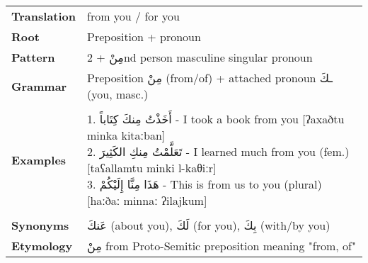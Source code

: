 \documentclass[letterpaper,12pt]{article}
\begin{document}
\begin{tabular}{p{3cm}p{10cm}}
\toprule
\textbf{Translation} & from you / for you \\
\textbf{Root} & Preposition + pronoun \\
\textbf{Pattern} & \textarabic{مِنْ} + 2nd person masculine singular pronoun \\
\textbf{Grammar} & Preposition \textarabic{مِنْ} (from/of) + attached pronoun \textarabic{ـكَ} (you, masc.) \\
\midrule \\
\textbf{Examples} & \makecell[l]{\parbox{9.5cm}{
1. \textarabic{أَخَذْتُ مِنكَ كِتَاباً} - I took a book from you [ʔaxaðtu minka kitaːban]\\
2. \textarabic{تَعَلَّمْتُ مِنكِ الكَثِيرَ} - I learned much from you (fem.) [taʕallamtu minki l-kaθiːr]\\
3. \textarabic{هَذَا مِنَّا إِلَيْكُمْ} - This is from us to you (plural) [haːðaː minnaː ʔilajkum]
}} \\
\midrule \\
\textbf{Synonyms} & \textarabic{عَنكَ} (about you), \textarabic{لَكَ} (for you), \textarabic{بِكَ} (with/by you) \\
\textbf{Etymology} & \textarabic{مِنْ} from Proto-Semitic preposition meaning "from, of" \\
\bottomrule
\end{tabular}

\end{document}

